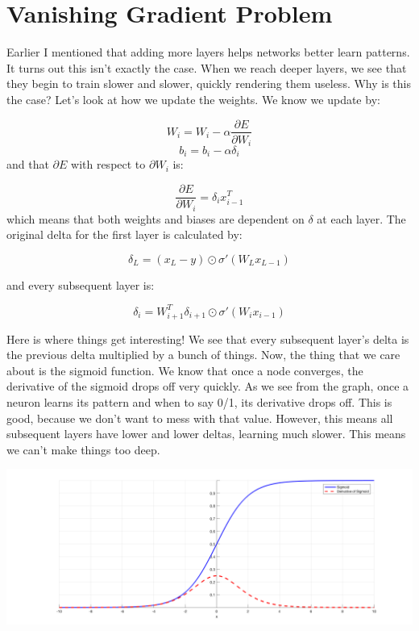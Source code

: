 \documentclass{article}
\begin{document}
\section{Vanishing Gradient Problem}
    Earlier I mentioned that adding more layers helps networks better learn patterns. It turns out this isn't exactly the case. When we reach deeper layers, we see that they begin to train slower and slower, quickly rendering them useless. Why is this the case? Let's look at how we update the weights. We know we update by:
    
    $$W_i =  W_i - \alpha \frac{\partial E}{\partial W_i}$$
    $$b_i =  b_i - \alpha \delta_i$$
    and that $\partial E$ with respect to $\partial W_i$ is:
    
    $$\frac{\partial E}{\partial W_i} = \delta_i x_{i-1}^T$$
    which means that both weights and biases are dependent on $\delta$ at each layer.
    The original delta for the first layer is calculated by: 
    
    $$\delta_L = (x_L - y) \odot \sigma'(W_{L}x_{L-1})$$
    
    and every subsequent layer is:
    
    $$\delta_i = W_{i+1}^T\delta_{i+1} \odot \sigma'(W_ix_{i-1})$$
    
    Here is where things get interesting! We see that every subsequent layer's delta is the previous delta multiplied by a bunch of things. Now, the thing that we care about is the sigmoid function. We know that once a node converges, the derivative of the sigmoid drops off very quickly. As we see from the graph, once a neuron learns its pattern and when to say 0/1, its derivative drops off. This is good, because we don't want to mess with that value. However, this means all subsequent layers have lower and lower deltas, learning much slower. This means we can't make things too deep.
       
     \begin{center}
        \includegraphics[scale=0.15]{sigmoid.png}
    \end{center}
\end{document}
